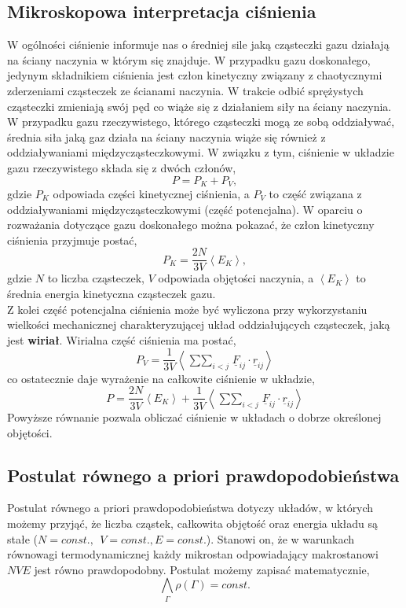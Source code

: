 \documentclass[12pt,a4paper,openright]{report} %
\begin{document}
\subsection{Mikroskopowa interpretacja ciśnienia}
W ogólności ciśnienie informuje nas o średniej sile jaką cząsteczki gazu działają na ściany naczynia w którym się znajduje. W przypadku gazu doskonałego, jedynym składnikiem ciśnienia jest człon kinetyczny związany z chaotycznymi zderzeniami cząsteczek ze ścianami naczynia. W trakcie odbić sprężystych cząsteczki zmieniają swój pęd co wiąże się z działaniem siły na ściany naczynia. W przypadku gazu rzeczywistego, którego cząsteczki mogą ze sobą oddziaływać, średnia siła jaką gaz działa na ściany naczynia wiąże się również z oddziaływaniami międzycząsteczkowymi. W związku z tym, ciśnienie w układzie gazu rzeczywistego składa się z dwóch członów,
\begin{equation}
P=P_K + P_V,
\end{equation}
gdzie $P_K$ odpowiada części kinetycznej ciśnienia, a $P_V$ to część związana z oddziaływaniami międzycząsteczkowymi (część potencjalna). 
W oparciu o rozważania dotyczące gazu doskonałego można pokazać, że człon kinetyczny ciśnienia przyjmuje postać,
\begin{equation}
P_K=\frac{2N}{3V} \left< E_K \right>,
\end{equation}
gdzie $N$ to liczba cząsteczek, $V$ odpowiada objętości naczynia, a $\left< E_K \right>$ to średnia energia kinetyczna cząsteczek gazu. \\
Z kolei część potencjalna ciśnienia może być wyliczona przy wykorzystaniu wielkości mechanicznej charakteryzującej układ oddziałujących cząsteczek, jaką jest \textbf{wiriał}. Wirialna część ciśnienia ma postać,
\begin{equation}
P_V= \frac{1}{3V} \left< \mathop{\sum \sum}_{i<j} \underline{F}_{ij} \cdot \underline{r}_{ij} \right>
\end{equation}
co ostatecznie daje wyrażenie na całkowite ciśnienie w układzie,
\begin{equation}
P=\frac{2N}{3V} \left< E_K \right> + \frac{1}{3V} \left< \mathop{\sum \sum}_{i<j} \underline{F}_{ij} \cdot \underline{r}_{ij} \right>
\label{eq:Pvir}
\end{equation}
Powyższe równanie pozwala obliczać ciśnienie w układach o dobrze określonej objętości.
\subsection{Postulat równego a priori prawdopodobieństwa}
Postulat równego a priori prawdopodobieństwa dotyczy układów, w których możemy przyjąć, że liczba cząstek, całkowita objętość oraz energia układu są stałe ($N = const.,~~V=const., E = const.$). Stanowi on, że w warunkach równowagi termodynamicznej każdy mikrostan odpowiadający makrostanowi $NVE$ jest równo prawdopodobny. Postulat możemy zapisać matematycznie,
\begin{equation}
\bigwedge_{\Gamma} \rho(\Gamma) = const. 
\label{eq:post_a_priori}
\end{equation} 
\end{document}
